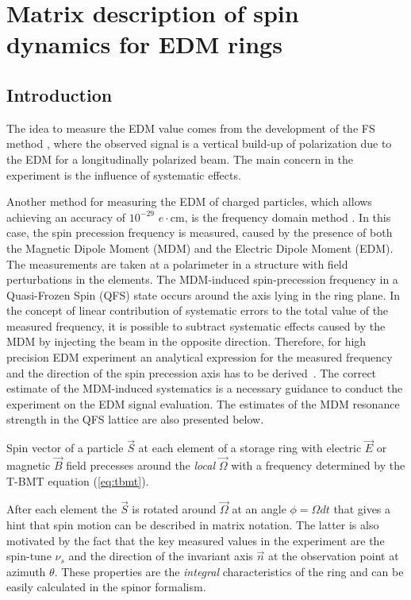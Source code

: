 \section{Matrix description of spin dynamics for EDM rings}
\label{sec:spinor}


\subsection{Introduction}
The idea to measure the EDM value comes from the development of the FS method \cite{srEDM:2008_deuteron_proposal,Farley:2004hp}, where the observed signal is a vertical build-up of polarization due to the EDM for a longitudinally polarized beam. The main concern in the experiment is the influence of systematic effects. 

Another method for measuring the EDM of charged particles, which allows achieving an accuracy of $10^{-29}$ $e\cdot$cm,
is the frequency domain method \cite{Senichev:2017amn,Aksentev:2020irr,Aksentev:2017nlq}. In this case, the spin precession frequency is measured, caused by the presence of both the Magnetic Dipole Moment (MDM) and the Electric Dipole Moment (EDM). The measurements are taken at a polarimeter in a structure with field perturbations in the elements. The MDM-induced spin-precession frequency in a Quasi-Frozen Spin (QFS)  \cite{Senichev:2022ide} state occurs around the axis lying in the ring plane. In the concept of linear contribution of systematic errors to the total value of the measured frequency, it is possible to
subtract systematic effects caused by the MDM by injecting
the beam in the opposite direction. Therefore, for high precision EDM experiment an analytical expression for the measured frequency and the direction of the spin precession axis has to be derived~\cite{Melnikov:2024wsn,Aksentev:2021fsy}. The correct estimate of the MDM-induced systematics is a necessary guidance to conduct the experiment on the EDM signal evaluation. The estimates of the MDM resonance strength in the QFS lattice are also presented below.

Spin vector of a particle $\vec{S}$ at each element of a storage ring with electric $\vec{E}$ or magnetic $\vec{B}$ field precesses around the \textit{local} $\vec{\Omega}$ with a frequency determined by the T-BMT equation (\ref{eq:tbmt}).

After each element the $\vec{S}$ is rotated around $\vec{\Omega}$ at an angle $\phi=\Omega dt$ that gives a hint that spin motion can be described in matrix notation. The latter is also motivated by the fact that the key measured values in the experiment are the spin-tune $\nu_s$ and the direction of the invariant axis $\vec{n}$ at the observation point at azimuth $\theta$. These properties are the \textit{integral} characteristics of the ring and can be easily calculated in the spinor formalism. 

